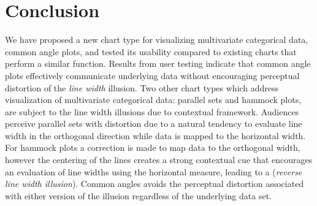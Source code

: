 \documentclass[journal]{vgtc}\usepackage{graphicx, color}
\begin{document}
\section{Conclusion}
We have proposed a new chart type for visualizing multivariate categorical data, common angle plots, 
and tested its usability compared to existing charts that perform a similar function. Results from user testing
indicate
that common angle plots effectively communicate underlying data without encouraging perceptual distortion of the 
\emph{line width} illusion.
Two other chart types which address visualization of multivariate categorical data: parallel sets and hammock plots, 
are subject to the line width illusions due to 
contextual framework. Audiences perceive parallel sets with distortion due to a natural tendency to 
evaluate line width in the orthogonal direction while data is mapped to the horizontal width.
For hammock plots a correction is made to map data to the orthogonal width, however the centering of the lines creates a strong contextual cue that encourages an evaluation of line widths using the
horizontal measure, leading to a (\emph{reverse line width illusion}). Common angles avoids the perceptual distortion 
associated with either version of the illusion regardless of the underlying data set.



%
\end{document}
